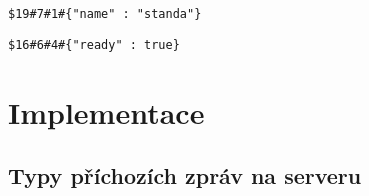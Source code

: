 \documentclass[12pt, a4paper]{article}
\let\oldsection\section
\renewcommand\section{\clearpage\oldsection}
\begin{document}
        \begin{lstlisting}[caption={Zpráva protokolu, která je typu \texttt{7} a je identifikována číslem \texttt{1}. Její datová část je dlouhá 19 bytů.},captionpos=b]
		$19#7#1#{"name" : "standa"}
		\end{lstlisting}
			
        \begin{lstlisting}[caption={Zpráva protokolu, která je typu \texttt{6} a je identifikována číslem \texttt{4}. Její datová část je dlouhá 16 bytů.},captionpos=b]
		$16#6#4#{"ready" : true}
		\end{lstlisting}
	

    \section{Implementace}
	    \subsection{Typy příchozích zpráv na serveru}		    
	    
\end{document}

